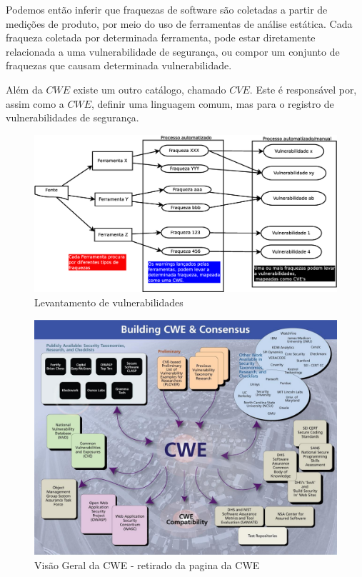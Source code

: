 Podemos então inferir que fraquezas de software são coletadas a partir de medições de produto, por meio do uso de ferramentas de análise estática.
Cada fraqueza coletada por determinada ferramenta, pode estar diretamente relacionada a uma vulnerabilidade de segurança, ou compor um conjunto de fraquezas que causam determinada vulnerabilidade.

Além da $CWE$ existe um outro catálogo, chamado $CVE$. Este é responsável por, assim como a $CWE$, definir uma linguagem comum, mas para o registro
de vulnerabilidades de segurança.

\begin{figure}[h]
	\centering
	\label{fig02}
        \includegraphics[scale=0.38]{figuras/vul1.eps}
	\caption{Levantamento de vulnerabilidades}
\end{figure}

\begin{figure}[h]
	\centering
	\label{fig03}
        \includegraphics[scale=0.38]{figuras/lg_consensus.eps}
        \caption{Visão Geral da CWE - retirado da pagina da CWE}
\end{figure}
